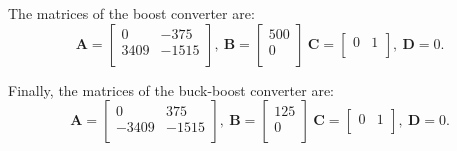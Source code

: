 \documentclass[runningheads,a4paper]{llncs}
\begin{document}
The matrices of the boost converter are:
$$
\textbf{A}=\left[\begin{array}{cc}
0		& -375 \\
3409	& -1515\\
\end{array}\right],~ \textbf{B} = \left[\begin{array}{c}
500 \\ 0 \\
\end{array}\right]~
\textbf{C}=\left[\begin{array}{cc}
0 & 1\\
\end{array}\right],~ \textbf{D}= 0.
$$

Finally, the matrices of the buck-boost converter are:
$$
\textbf{A}=\left[\begin{array}{cc}
0		& 375 \\
-3409	& -1515\\
\end{array}\right],~ \textbf{B} = \left[\begin{array}{c}
125 \\ 0 \\
\end{array}\right]~
\textbf{C}=\left[\begin{array}{cc}
0 & 1\\
\end{array}\right],~ \textbf{D}= 0.
$$
\end{document}
